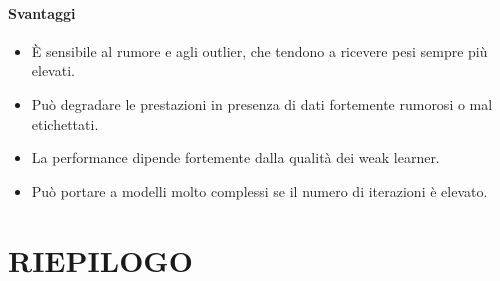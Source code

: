 \documentclass[a4paper,12pt]{report}
\begin{document}
\paragraph{Svantaggi}
\begin{itemize}
    \item È sensibile al rumore e agli outlier, che tendono a ricevere pesi sempre più elevati.
    \item Può degradare le prestazioni in presenza di dati fortemente rumorosi o mal etichettati.
    \item La performance dipende fortemente dalla qualità dei weak learner.
    \item Può portare a modelli molto complessi se il numero di iterazioni è elevato.
\end{itemize}

\newpage
\section*{RIEPILOGO}
\end{document}
